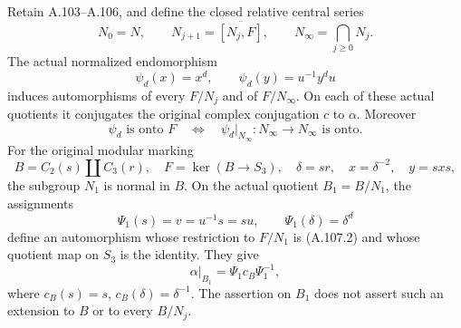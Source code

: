 Retain A.103--A.106, and define the closed relative central series
\[
 N_0=N,\qquad N_{j+1}=\overline{[N_j,F]},\qquad
 N_\infty=\bigcap_{j\geq0}N_j .
 \tag{A.107.1}
\]
The actual normalized endomorphism
\[
 \psi_d(x)=x^d,\qquad \psi_d(y)=u^{-1}y^du
 \tag{A.107.2}
\]
induces automorphisms of every \(F/N_j\) and of \(F/N_\infty\).
On each of these actual quotients it conjugates the original
complex conjugation \(c\) to \(\alpha\). Moreover
\[
 \psi_d\text{ is onto }F
 \quad\Longleftrightarrow\quad
 \psi_d|_{N_\infty}:N_\infty\to N_\infty\text{ is onto}.
 \tag{A.107.3}
\]
For the original modular marking
\[
 B=C_2(s)\amalg C_3(r),\quad
 F=\ker(B\to S_3),\quad
 \delta=sr,\quad x=\delta^{-2},\quad y=sxs,
\]
the subgroup \(N_1\) is normal in \(B\). On the actual quotient
\(B_1=B/N_1\), the assignments
\[
 \Psi_1(s)=v=u^{-1}s=su,\qquad
 \Psi_1(\delta)=\delta^d
 \tag{A.107.4}
\]
define an automorphism whose restriction to \(F/N_1\) is (A.107.2)
and whose quotient map on \(S_3\) is the identity. They give
\[
 \alpha|_{B_1}=\Psi_1 c_B\Psi_1^{-1},
 \tag{A.107.5}
\]
where \(c_B(s)=s\), \(c_B(\delta)=\delta^{-1}\).
The assertion on \(B_1\) does not assert such an extension to \(B\)
or to every \(B/N_j\).

